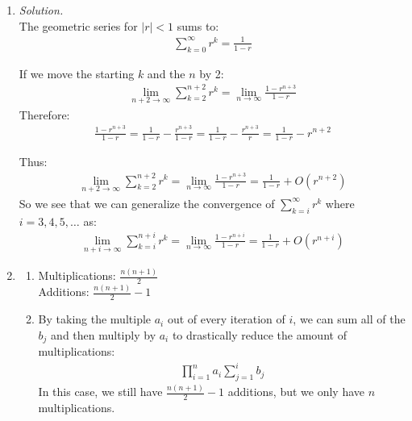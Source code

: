 \documentclass[12pt,letterpaper]{article}
\begin{document}
\begin{enumerate}
        \item 
        \emph{Solution.} \\
        The geometric series for $|r| < 1$ sums to: 
        \begin{gather*}
            \sum^{\infty}_{k=0} r^k = \frac{1}{1-r}
        \end{gather*}

        If we move the starting $k$ and the $n$ by 2: 
        \begin{gather*}
            \lim_{n+2 \rightarrow \infty} \sum^{n+2}_{k=2} r^k = \lim_{n \rightarrow \infty} \frac{1-r^{n+3}}{1-r}
        \end{gather*}
        Therefore: 
        \begin{gather*}
            \frac{1-r^{n+3}}{1-r} = \frac{1}{1-r} - \frac{r^{n+3}}{1-r} = \frac{1}{1-r} - \frac{r^{n+3}}{r} = \frac{1}{1-r} - r^{n+2}
        \end{gather*}

        Thus: 
        \begin{gather*}
            \lim_{n+2 \rightarrow \infty} \sum^{n+2}_{k=2} r^k = \lim_{n \rightarrow \infty} \frac{1-r^{n+3}}{1-r} = \frac{1}{1-r} + O(r^{n+2})
        \end{gather*}
        So we see that we can generalize the convergence of $\sum^{\infty}_{k=i} r^k$ where 
        $i = 3, 4, 5, \dots$ as: 
        \begin{gather*}
            \lim_{n+i \rightarrow \infty} \sum^{n+i}_{k=i} r^k = \lim_{n \rightarrow \infty} \frac{1-r^{n+i}}{1-r} = \frac{1}{1-r} + O(r^{n+i})
        \end{gather*}

        \item 
        \begin{enumerate}
            \item 
            Multiplications: $\frac{n(n+1)}{2}$\\
            Additions: $\frac{n(n+1)}{2} - 1$
            \item 
            By taking the multiple $a_i$ out of every iteration of $i$, we can sum
            all of the $b_j$ and then multiply by $a_i$ to drastically reduce the 
            amount of multiplications: 
            \begin{gather*}
                \prod^{n}_{i = 1}a_{i}\sum^{i}_{j = 1}b_j
            \end{gather*}
            In this case, we still have $\frac{n(n+1)}{2}-1$ additions, but we only have 
            $n$ multiplications. 
        \end{enumerate}


\end{enumerate}
\end{document}

